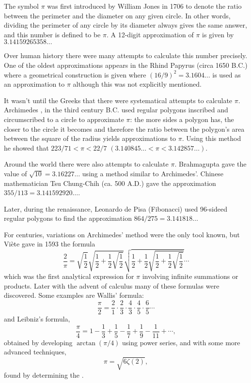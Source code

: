 \documentclass[12pt]{article}
\newcommand{\medio}{\frac{1}{2}}
\newcommand{\<}{\langle}
\renewcommand{\>}{\rangle}
\begin{document}
The symbol $\pi$ was first introduced by William Jones \cite{higham, jones} in 1706 to denote the ratio between the perimeter and the diameter on any given circle.  In other words, dividing the perimeter of any circle by its diameter always gives the same answer, and this number is defined to be $\pi$.  A 12-digit approximation of $\pi$ is given by $3.14159265358...$

Over human history there were many attempts to calculate this number precisely. One of the oldest approximations appears in the Rhind Papyrus (circa 1650 B.C.) where a geometrical construction is given where $(16/9)^2=3.1604\ldots$ is used as an approximation to $\pi$ although this was not explicitly mentioned. 

It wasn't until the Greeks that there were systematical attempts to calculate $\pi$. Archimedes \cite{Mact}, in the third century B.C. used regular polygons inscribed and circumscribed to a circle to approximate $\pi$: the more sides a polygon has, the closer to the circle it becomes and therefore the ratio between the polygon's area between the square of the radius yields approximations to $\pi$. Using this method he showed that $223/71<\pi<22/7$ $(3.140845\ldots<\pi<3.142857\ldots)$. 

Around the world there were also attempts to calculate $\pi$. 
Brahmagupta \cite{Mact} gave the value of $\sqrt{10}=3.16227\ldots$ using a method similar to Archimedes'. Chinese mathematician Tsu Chung-Chih (ca. 500 A.D.) gave the approximation $355/113=3.141592920\ldots$.

Later, during the renaissance, Leonardo de Pisa (Fibonacci) \cite{Mact} used 96-sideed regular polygons to find the approximation $864/275=3.141818\ldots$

For centuries, variations on Archimedes' method were the only tool known, but  Vi\`ete \cite{Mact} gave in 1593 the formula $$\frac{2}{\pi}=\sqrt{\medio}\sqrt{\medio+\medio\sqrt{\medio}}\sqrt{\medio+\medio\sqrt{\medio+\medio\sqrt{\medio}}}\cdots$$
which was the first analytical expression for $\pi$ involving infinite summations or products. Later with the advent of calculus many of these formulas were discovered. Some examples are 
Wallis' \cite{Mact} formula:
$$\frac{\pi}{2}=\frac{2}{1}\cdot\frac{2}{3}\cdot\frac{4}{3}\cdot\frac{4}{5}\cdot\frac{6}{5}\cdots$$
and Leibniz's formula,
$$\frac{\pi}{4}=1-\frac{1}{3}+\frac{1}{5}-\frac{1}{7}+\frac{1}{9}-\frac{1}{11}+\cdots,$$
obtained by developing $\arctan(\pi/4)$ using power series, and with some more advanced techniques,
$$\pi=\sqrt{6\zeta(2)},$$
found by determining the .
\end{document}
